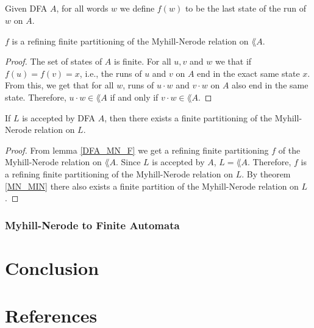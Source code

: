 \documentclass[11pt,a4paper,oneside]{book}
\begin{document}
            \paragraph{}
                Given DFA $A$, for all words $w$ we define $f(w)$ to be the last state of the run of $w$ on $A$.

            \begin{lemma} 
                \label{DFA_MN_F}
                $f$ is a refining finite partitioning of the Myhill-Nerode relation on $\lang{A}$. 
            \end{lemma} 
            \begin{proof} 
                The set of states of $A$ is finite.
                For all $u, v$ and $w$ we that if $f(u) = f(v) = x$, i.e.,
                the runs of $u$ and $v$ on $A$ end in the exact same state $x$.
                From this, we get that for all $w$, runs of $u \cdot w$ and $v \cdot w$ on $A$ also end in the same state.
                Therefore, $u\cdot w \in \lang{A}$ if and only if $v \cdot w \in \lang{A}$.
            \end{proof}

            \begin{theorem}
                If $L$ is accepted by DFA $A$, then there exists a finite partitioning of the Myhill-Nerode relation on $L$.
            \end{theorem}
            \begin{proof}
                From lemma \ref{DFA_MN_F} we get a refining finite partitioning $f$ of the Myhill-Nerode relation on $\lang{A}$. 
                Since $L$ is accepted by $A$, $L = \lang{A}$. 
                Therefore, $f$ is a refining finite partitioning of the Myhill-Nerode relation on $L$.
                By theorem \ref{MN_MIN} there also exists a finite partition of the Myhill-Nerode relation on $L$.
            \end{proof}


        \subsection{Myhill-Nerode to Finite Automata}

            \paragraph{}


    \chapter{Conclusion}

    \chapter{References}

    \nocite{*}

    {}
    
\end{document}
